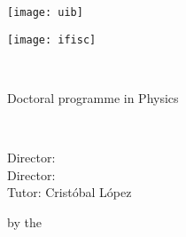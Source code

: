 \documentclass[../thesis.tex]{subfiles}
\begin{document}
\begin{titlepage}
    \begin{addmargin}[-1cm]{-3cm}
        \large

        \hfill
        \begin{minipage}[c][0.2\textheight]{0.5\textwidth}
            \texttt{[image: uib]}
        \end{minipage}
        \hfill
        \begin{minipage}[c][0.2\textheight]{0.5\textwidth}
            \texttt{[image: ifisc]}
        \end{minipage}
        \hfill

        \begin{center}
            \vspace*{.1\textheight}
        
             \\
            \myYear
        
            \bigskip

            Doctoral programme in Physics \\

            \vfill
        
            \begingroup
                \spacedallcaps{\myTitle}
                \\ \smallskip
                \textsc{\MakeLowercase{\mySubtitle}}
            \endgroup

            \bigskip
            
            \spacedlowsmallcaps{\myName}
            
            \vfill

            \begin{flushleft}
                Director: \mySupervisor \\
                Director: \myOtherSupervisor \\
                Tutor: Cristóbal López \\

                \vfill

                \myDegree by the \myUni
            \end{flushleft}
        
        \end{center}
    \end{addmargin}
\end{titlepage}
\end{document}
